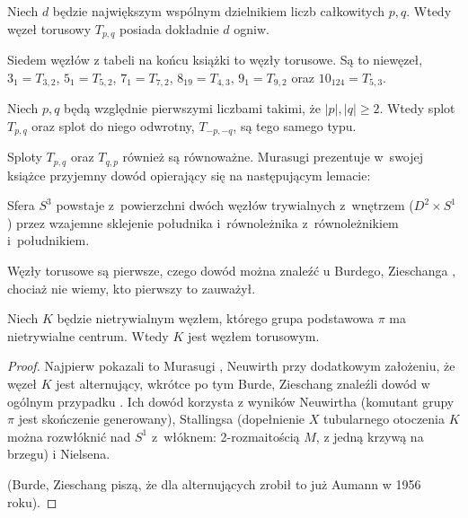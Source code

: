 \begin{proposition}
    Niech $d$ będzie największym wspólnym dzielnikiem liczb całkowitych $p, q$.
    Wtedy węzeł torusowy $T_{p, q}$ posiada dokładnie $d$ ogniw.
\end{proposition}

Siedem węzłów z tabeli na końcu książki to węzły torusowe.
Są to niewęzeł, $3_1 = T_{3,2}$, $5_1 = T_{5,2}$, $7_1 = T_{7,2}$, $8_{19} = T_{4,3}$, $9_1 = T_{9,2}$ oraz $10_{124} = T_{5, 3}$.

\begin{proposition}
    Niech $p, q$ będą względnie pierwszymi liczbami takimi, że $|p|, |q| \ge 2$.
    Wtedy splot $T_{p, q}$ oraz splot do niego odwrotny, $T_{-p, -q}$, są tego samego typu.
\end{proposition}

Sploty $T_{p, q}$ oraz $T_{q, p}$ również są równoważne.
Murasugi prezentuje w~swojej książce \cite{murasugi1996} przyjemny dowód opierający się na następującym lemacie:

\begin{lemma}
    Sfera $S^3$ powstaje z~powierzchni dwóch węzłów trywialnych z~wnętrzem ($D^2 \times S^1$) przez wzajemne sklejenie południka i~równoleżnika z~równoleżnikiem i~południkiem.
\end{lemma}

Węzły torusowe są pierwsze, czego dowód można znaleźć u Burdego, Zieschanga \cite[s. 95]{burde2014}, chociaż nie wiemy, kto pierwszy to zauważył.

\begin{proposition}
\label{prp:torus_nontrivial_center}
    Niech $K$ będzie nietrywialnym węzłem, którego grupa podstawowa $\pi$ ma nietrywialne centrum.
    Wtedy $K$ jest węzłem torusowym.
\end{proposition}

\begin{proof}
%
%
%
%
%
%
    Najpierw pokazali to Murasugi \cite{murasugi1961}, Neuwirth \cite{neuwirth1961} przy dodatkowym założeniu, że węzeł $K$ jest alternujący,
    wkrótce po tym Burde, Zieschang znaleźli dowód w ogólnym przypadku \cite{zieschang1966}.
    Ich dowód korzysta z wyników Neuwirtha (komutant grupy $\pi$ jest skończenie generowany), Stallingsa (dopełnienie $X$ tubularnego otoczenia $K$ można rozwłóknić nad $S^1$ z~włóknem: 2-rozmaitością $M$, z jedną krzywą na brzegu) i Nielsena.

    (Burde, Zieschang piszą, że dla alternujących zrobił to już Aumann \cite{aumann1956} w 1956 roku).
\end{proof}

